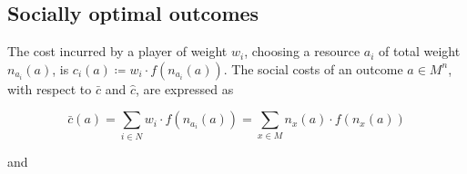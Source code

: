 




\subsection{Socially optimal outcomes}

The cost incurred by a player of weight $w_i$, choosing a resource $a_i$ of total weight $n_{a_i}(a)$, is $c_i(a) \coloneqq w_i \cdot f(n_{a_i}(a))$. The social costs of an outcome $a \in M^n$, with respect to $\bar c$ and $\hat c$, are expressed as

\[ \bar c(a) = \sum_{i \in N} w_i \cdot f(n_{a_i}(a)) = \sum_{x \in M} n_x(a) \cdot f(n_x(a)) \]

and

